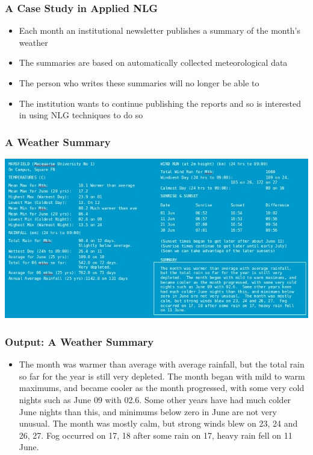 \documentclass[compress,color=usenames]{beamer}
\begin{document}
\begin{frame}
\frametitle{A Case Study in Applied NLG}

\begin{itemize}
\item { {Each month an institutional newsletter publishes a summary of the month's weather}}
\item { {The summaries are based on automatically collected meteorological data}}
\item { {The person who writes these summaries will no longer be able to}}
\item { {The institution wants to continue publishing the reports and so is interested in using NLG techniques to do so}}
\end{itemize}

\end{frame}

\begin{frame}
\frametitle{A Weather Summary}

\begin{center}
\includegraphics[scale=.47]{pics/pic5.jpg}
\end{center}

\end{frame}


\begin{frame}
\frametitle{Output: A Weather Summary}

\label{f70}
\begin{itemize}
\item { {The month was warmer than average with average rainfall, but the total rain so far for the year is still very depleted. The month began with mild to warm maximums, and became cooler as the month progressed, with some very cold nights such as June 09 with 02.6. Some other years have had much colder June nights than this, and minimums below zero in June are not very unusual. The month was mostly calm, but strong winds blew on 23, 24 and 26, 27. Fog occurred on 17, 18 after some rain on 17, heavy rain fell on 11 June.}}
\end{itemize}

\end{frame}
\end{document}

